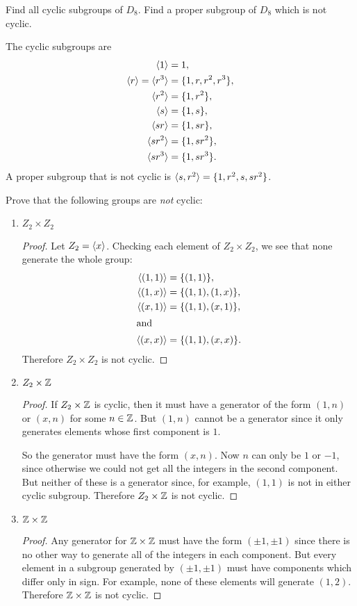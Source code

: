  Find all cyclic subgroups of $D_8$. Find a proper
subgroup of $D_8$ which is not cyclic.
\begin{solution}
  The cyclic subgroups are
  \begin{align*}
    \langle{1}\rangle &= 1, \\
    \langle{r}\rangle = \langle{r^3}\rangle &= \{1, r, r^2, r^3\}, \\
    \langle{r^2}\rangle &= \{1, r^2\}, \\
    \langle{s}\rangle &= \{1, s\}, \\
    \langle{sr}\rangle &= \{1, sr\}, \\
    \langle{sr^2}\rangle &= \{1, sr^2\}, \\
    \langle{sr^3}\rangle &= \{1, sr^3\}.
  \end{align*}
  A proper subgroup that is not cyclic is
  $\langle{s, r^2}\rangle = \{1, r^2, s, sr^2\}$.
\end{solution}

 Prove that the following groups are {\em not} cyclic:
\label{exercise-prove-groups-not-cyclic}
\begin{enumerate}
\item $Z_2\times Z_2$
  \begin{proof}
    Let $Z_2 = \langle{x}\rangle$. Checking each element of $Z_2\times Z_2$, we
    see that none generate the whole group:
    \begin{align*}
      \langle{(1,1)}\rangle &= \{(1,1)\}, \\
      \langle{(1,x)}\rangle &= \{(1,1), (1,x)\}, \\
      \langle{(x,1)}\rangle &= \{(1,1), (x,1)\}, \\
      \intertext{and}
      \langle{(x,x)}\rangle &= \{(1,1), (x,x)\}.
    \end{align*}
    Therefore $Z_2\times Z_2$ is not cyclic.
  \end{proof}
\item $Z_2\times\mathbb{Z}$
  \begin{proof}
    If $Z_2\times\mathbb{Z}$ is cyclic, then it must have a generator of the
    form $(1, n)$ or $(x, n)$ for some $n\in\mathbb{Z}$. But $(1,n)$ cannot be
    a generator since it only generates elements whose first component
    is $1$.

    So the generator must have the form $(x,n)$. Now $n$ can only be
    $1$ or $-1$, since otherwise we could not get all the integers in
    the second component. But neither of these is a generator since,
    for example, $(1,1)$ is not in either cyclic subgroup. Therefore
    $Z_2\times\mathbb{Z}$ is not cyclic.
  \end{proof}
\item $\mathbb{Z}\times\mathbb{Z}$
  \begin{proof}
    Any generator for $\mathbb{Z}\times\mathbb{Z}$ must have the form $(\pm1,\pm1)$
    since there is no other way to generate all of the integers in
    each component. But every element in a subgroup generated by
    $(\pm1,\pm1)$ must have components which differ only in sign. For
    example, none of these elements will generate $(1,2)$. Therefore
    $\mathbb{Z}\times\mathbb{Z}$ is not cyclic.
  \end{proof}
\end{enumerate}

